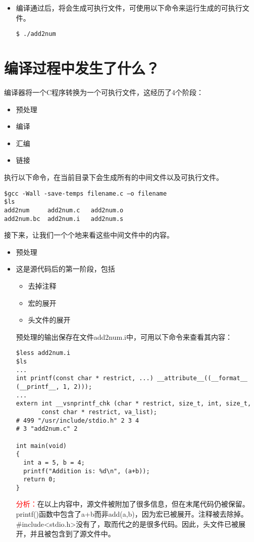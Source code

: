 \documentclass[10pt,a4paper%
tablecaptionabove]{article}
\newcommand{\red}{\textcolor{red}}
\begin{document}
\begin{CJK}{UTF8}{gkai}
\begin{itemize}
\item 编译通过后，将会生成可执行文件，可使用以下命令来运行生成的可执行文件。


\begin{lstlisting}[backgroundcolor=\color{red!10}]
$ ./add2num
\end{lstlisting}

\end{itemize}


\section{编译过程中发生了什么？}

编译器将一个C程序转换为一个可执行文件，这经历了4个阶段：
\begin{itemize}
\item 预处理
\item 编译
\item 汇编
\item 链接
\end{itemize}
执行以下命令，在当前目录下会生成所有的中间文件以及可执行文件。
\begin{lstlisting}[backgroundcolor=\color{red!10}]
$gcc -Wall -save-temps filename.c –o filename 
$ls 
add2num		add2num.c	add2num.o
add2num.bc	add2num.i	add2num.s
\end{lstlisting}

接下来，让我们一个个地来看这些中间文件中的内容。
\begin{itemize}
\item 预处理
\item[] 这是源代码后的第一阶段，包括
\begin{itemize}
\item 去掉注释
\item 宏的展开
\item 头文件的展开
\end{itemize}
预处理的输出保存在文件add2num.i中，可用以下命令来查看其内容：
\begin{lstlisting}[backgroundcolor=\color{red!10}]
$less add2num.i
$ls 
...
int printf(const char * restrict, ...) __attribute__((__format__ (__printf__, 1, 2)));
...
extern int __vsnprintf_chk (char * restrict, size_t, int, size_t,
       const char * restrict, va_list);
# 499 "/usr/include/stdio.h" 2 3 4
# 3 "add2num.c" 2

int main(void)
{
  int a = 5, b = 4;
  printf("Addition is: %d\n", (a+b));
  return 0;
}
\end{lstlisting}
\red{分析：}在以上内容中，源文件被附加了很多信息，但在末尾代码仍被保留。{\ttfamily printf()}函数中包含了{\ttfamily a+b}而非{\ttfamily add(a,b)}，因为宏已被展开。注释被去除掉。{\ttfamily\#include<stdio.h>}没有了，取而代之的是很多代码。因此，头文件已被展开，并且被包含到了源文件中。


\end{itemize}
\end{CJK}
\end{document}
